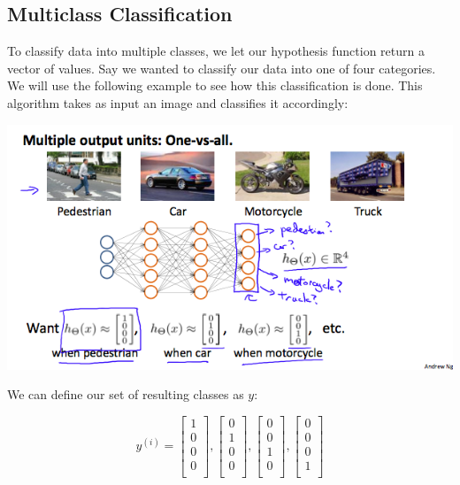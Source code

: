 \documentclass[UTF8]{article}
\begin{document}
\subsection{Multiclass Classification}

To classify data into multiple classes, we let our hypothesis function return a vector of values. Say we wanted to classify our data into one of four categories. We will use the following example to see how this classification is done. This algorithm takes as input an image and classifies it accordingly:

\includegraphics[width = \textwidth]{NotePics/8_5_1.png}

We can define our set of resulting classes as $y$:

$$y^{(i)} =\begin{bmatrix}1 \\ 0 \\ 0 \\ 0 \\\end{bmatrix},\begin{bmatrix}0 \\ 1 \\ 0 \\ 0 \\\end{bmatrix},\begin{bmatrix}0 \\ 0 \\ 1 \\ 0 \\\end{bmatrix},\begin{bmatrix}0 \\ 0 \\ 0 \\ 1 \\\end{bmatrix}$$
\end{document}
